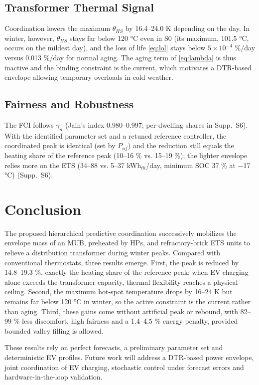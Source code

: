 \documentclass[conference]{IEEEtran}
\newcommand{\Supp}[1]{Supp.~S#1}          %
\begin{document}
\subsection{Transformer Thermal Signal}

Coordination lowers the maximum $\theta_{HS}$ by 16.4--24.0 K depending on the day. In winter, however, $\theta_{HS}$ stays far below 120 °C even in S0 (its maximum, 101.5 °C, occurs on the mildest day), and the loss of life \eqref{eq:lol} stays below $5\times10^{-4}$ \%/day versus 0.013 \%/day for normal aging. The aging term of \eqref{eq:lambda} is thus inactive and the binding constraint is the current, which motivates a DTR-based envelope allowing temporary overloads in cold weather.

\subsection{Fairness and Robustness}\label{sec:robust}

The FCI follows $\gamma_n$ (Jain's index 0.980--0.997; per-dwelling shares in \Supp{6}). With the identified parameter set and a retuned reference controller, the coordinated peak is identical (set by $P_{nf}$) and the reduction still equals the heating share of the reference peak (10--16 \% vs. 15--19 \%); the lighter envelope relies more on the ETS (34--88 vs. 5--37 kWh$_{th}$/day, minimum SOC 37 \% at −17 °C) (\Supp{6}).

\section{Conclusion}\label{sec:concl}

The proposed hierarchical predictive coordination successively mobilizes the envelope mass of an MUB, preheated by HPs, and refractory-brick ETS units to relieve a distribution transformer during winter peaks. Compared with conventional thermostats, three results emerge. First, the peak is reduced by 14.8--19.3 \%, exactly the heating share of the reference peak: when EV charging alone exceeds the transformer capacity, thermal flexibility reaches a physical ceiling. Second, the maximum hot-spot temperature drops by 16--24 K but remains far below 120 °C in winter, so the active constraint is the current rather than aging. Third, these gains come without artificial peak or rebound, with 82--99 \% less discomfort, high fairness and a 1.4--4.5 \% energy penalty, provided bounded valley filling is allowed.

These results rely on perfect forecasts, a preliminary parameter set and deterministic EV profiles. Future work will address a DTR-based power envelope, joint coordination of EV charging, stochastic control under forecast errors \cite{Oldewurtel2012} and hardware-in-the-loop validation.
\end{document}
